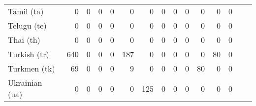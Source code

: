 \documentclass{csbulletin}
\begin{document}
\begin{table}[tbh]
\begin{tabular}{lrrrrrrrrrrrrrr}
Tamil (ta) %
  & 0%
  & 0%
  & 0%
  & 0%
  & 0%
  & 0%
  & 0%
  & 0%
  & 0%
  & 0%
  & 0%
  & 0%
  \\
Telugu (te) %
  & 0 %
  & 0%
  & 0%
  & 0%
  & 0%
  & 0%
  & 0%
  & 0%
  & 0%
  & 0%
  & 0%
  & 0%
  \\
Thai (th) %
  & 0 %
  & 0%
  & 0%
  & 0%
  & 0%
  & 0%
  & 0%
  & 0%
  & 0%
  & 0%
  & 0%
  & 0%
  \\
Turkish (tr) %
  & 640 %
  & 0%
  & 0%
  & 0%
  & 187%
  & 0%
  & 0%
  & 0%
  & 0%
  & 0%
  & 80%
  & 0%
  \\
Turkmen (tk) %
  & 69%
  & 0%
  & 0%
  & 0%
  & 9%
  & 0%
  & 0%
  & 0%
  & 0%
  & 80%
  & 0%
  & 0%
  \\
Ukrainian (ua) %
  & 0%
  & 0%
  & 0%
  & 0%
  & 0%
  & 125%
  & 0%
  & 0%
  & 0%
  & 0%
  & 0%
  & 0%
  \\
\bottomrule
\end{tabular}
\end{table}
\end{document}
